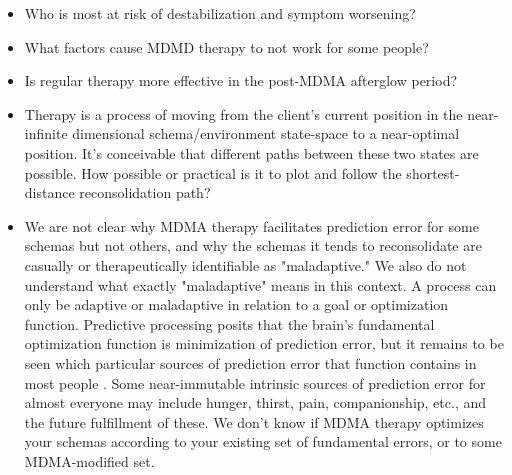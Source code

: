 \documentclass[12pt,letterpaper]{book}
\begin{document}
\begin{itemize}
    \item Who is most at risk of destabilization and symptom worsening?
    \item What factors cause MDMD therapy to not work for some people?
    \item Is regular therapy more effective in the post-MDMA afterglow period?
    \item Therapy is a process of moving from the client's current position in the near-infinite dimensional schema/environment state-space to a near-optimal position. It's conceivable that different paths between these two states are possible. How possible or practical is it to plot and follow the shortest-distance reconsolidation path?
    \item We are not clear why MDMA therapy facilitates prediction error for some schemas but not others, and why the schemas it tends to reconsolidate are casually or therapeutically identifiable as "maladaptive." We also do not understand what exactly "maladaptive" means in this context. A process can only be adaptive or maladaptive in relation to a goal or optimization function. Predictive processing posits that the brain's fundamental optimization function is minimization of prediction error, but it remains to be seen which particular sources of prediction error that function contains in most people \cite{clark2015surfing}. Some near-immutable intrinsic sources of prediction error for almost everyone may include hunger, thirst, pain, companionship, etc., and the future fulfillment of these. We don't know if MDMA therapy optimizes your schemas according to your existing set of fundamental errors, or to some MDMA-modified set.
\end{itemize}
\backmatter
\printbibliography
{}
\end{document}
